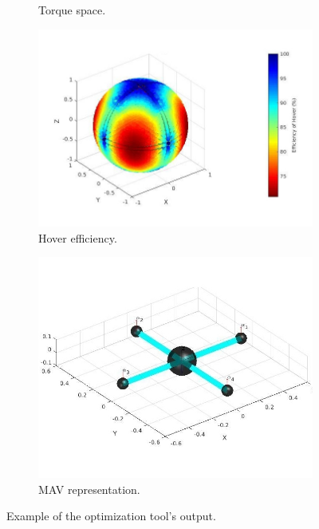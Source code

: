 \begin{figure}[!h]
\begin{subfigure}[b]{0.48\textwidth}
    \caption{Torque space.} \label{fig:tool_outputb}
  \end{subfigure}
  \hspace*{\fill} %
  \begin{subfigure}[b]{0.48\textwidth}
    \includegraphics[width=\linewidth]{images/n=4_hover.jpg}
    \caption{Hover efficiency.} \label{fig:tool_outputc}
  \end{subfigure}
  \hspace*{\fill} %
  \begin{subfigure}[b]{0.48\textwidth}
    \includegraphics[width=\linewidth]{images/n=4_model.jpg}
    \caption{MAV representation.} \label{fig:tool_outputd}
  \end{subfigure}
  \caption{Example of the optimization tool's output.}
  \label{fig:tool_output}
\end{figure}

